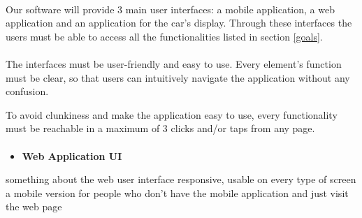 \documentclass[english]{article}
\begin{document}
\paragraph{}
Our software will provide 3 main user interfaces: a mobile application, a web application and an application for the car's display.
Through these interfaces the users must be able to access all the functionalities listed in section \ref{goals}.

\paragraph{}
The interfaces must be user-friendly and easy to use. Every element's function must be clear, so that users can intuitively navigate the application without any confusion.

To avoid clunkiness and make the application easy to use, every functionality must be reachable in a maximum of 3 clicks and/or taps from any page.


 \paragraph{}
 
\begin{itemize}
	\item{\textbf{Web Application UI}}
\end{itemize}
something about the web user interface
responsive, usable on every type of screen
a mobile version for people who don't have the mobile application and just visit the web page
\end{document}
